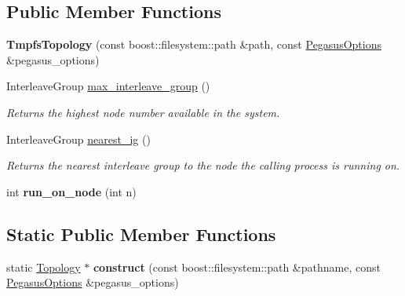 \subsection*{Public Member Functions}
\begin{DoxyCompactItemize}
\item 
{\bfseries Tmpfs\+Topology} (const boost\+::filesystem\+::path \&path, const \hyperlink{structalps_1_1PegasusOptions}{Pegasus\+Options} \&pegasus\+\_\+options)\hypertarget{classalps_1_1TmpfsTopology_ab9b305dc0370c5dbd8ca37c29aab4c1d}{}\label{classalps_1_1TmpfsTopology_ab9b305dc0370c5dbd8ca37c29aab4c1d}

\item 
Interleave\+Group \hyperlink{classalps_1_1TmpfsTopology_a1f4313dce7095500979318dcf754de04}{max\+\_\+interleave\+\_\+group} ()\hypertarget{classalps_1_1TmpfsTopology_a1f4313dce7095500979318dcf754de04}{}\label{classalps_1_1TmpfsTopology_a1f4313dce7095500979318dcf754de04}

\begin{DoxyCompactList}\small\item\em Returns the highest node number available in the system. \end{DoxyCompactList}\item 
Interleave\+Group \hyperlink{classalps_1_1TmpfsTopology_aff12311096104e9bcecaeabcb1bd7196}{nearest\+\_\+ig} ()\hypertarget{classalps_1_1TmpfsTopology_aff12311096104e9bcecaeabcb1bd7196}{}\label{classalps_1_1TmpfsTopology_aff12311096104e9bcecaeabcb1bd7196}

\begin{DoxyCompactList}\small\item\em Returns the nearest interleave group to the node the calling process is running on. \end{DoxyCompactList}\item 
int {\bfseries run\+\_\+on\+\_\+node} (int n)\hypertarget{classalps_1_1TmpfsTopology_ae1eae1973cee1120293686752cfb3129}{}\label{classalps_1_1TmpfsTopology_ae1eae1973cee1120293686752cfb3129}

\end{DoxyCompactItemize}
\subsection*{Static Public Member Functions}
\begin{DoxyCompactItemize}
\item 
static \hyperlink{classalps_1_1Topology}{Topology} $\ast$ {\bfseries construct} (const boost\+::filesystem\+::path \&pathname, const \hyperlink{structalps_1_1PegasusOptions}{Pegasus\+Options} \&pegasus\+\_\+options)\hypertarget{classalps_1_1TmpfsTopology_adedbd94b4c01dbdddb0241b276068145}{}\label{classalps_1_1TmpfsTopology_adedbd94b4c01dbdddb0241b276068145}

\end{DoxyCompactItemize}


